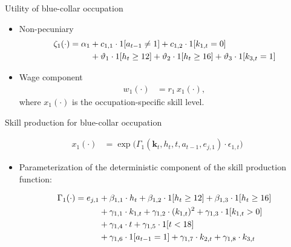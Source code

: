 \begin{frame}{Utility of blue-collar occupation}\vspace{0.25cm}

	\begin{itemize}\setlength\itemsep{1em}
	\item Non-pecuniary
  \begin{align*}
  \zeta_{1}(\cdot)  = \alpha_1 & + c_{1,1} \cdot 1[a_{t-1} \neq 1] + c_{1,2} \cdot 1[k_{1,t} = 0] \\
                              & + \vartheta_1 \cdot 1[h_t \geq 12] + \vartheta_2 \cdot 1[h_t \geq 16] + \vartheta_3 \cdot 1[k_{3,t} = 1]
  \end{align*}

	 \item Wage component
	 \begin{align*}
	 w_{1}(\cdot) & = r_{1} \, x_{1}(\cdot),
	 \end{align*}
where  $x_{1}(\cdot)$ is the occupation-specific skill level.
 \end{itemize}
\end{frame}
\begin{frame}{Skill production for blue-collar occupation}

\begin{align*}
	x_{1}(\cdot) & = \exp \big( \Gamma_{1}(\bm{k}_t,  h_t, t, a_{t-1}, e_{j,1}) \cdot \epsilon_{1,t} \big)
\end{align*}
\begin{itemize}\setlength\itemsep{1em}
\item Parameterization of the deterministic component of the skill production function:\vspace{-0.5cm}

\begin{align*}
     \Gamma_1(\cdot) = e_{j,1} & + \beta_{1,1} \cdot h_t + \beta_{1, 2} \cdot 1[h_t \geq 12] + \beta_{1,3} \cdot 1[h_t\geq 16]\\
                                   & + \gamma_{1, 1} \cdot  k_{1,t} + \gamma_{1,2} \cdot  (k_{1,t})^2 + \gamma_{1,3} \cdot  1[k_{1,t} > 0] \\
                                 & + \gamma_{1,4} \cdot  t + \gamma_{1,5} \cdot 1[t < 18]\\
                                   & + \gamma_{1,6} \cdot 1[a_{t-1} = 1] + \gamma_{1,7} \cdot  k_{2,t} + \gamma_{1,8} \cdot  k_{3,t}
\end{align*}
\end{itemize}

\end{frame}
